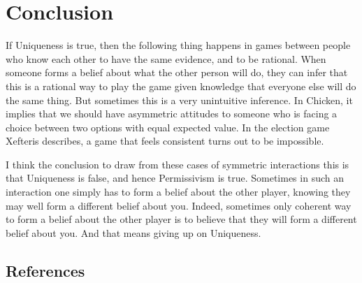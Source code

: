 \documentclass[
  11pt,
  letterpaper,
  DIV=11,
  numbers=noendperiod,
  twoside]{scrartcl}
\begin{document}
\section{Conclusion}\label{conclusion}

If Uniqueness is true, then the following thing happens in games between
people who know each other to have the same evidence, and to be
rational. When someone forms a belief about what the other person will
do, they can infer that this is a rational way to play the game given
knowledge that everyone else will do the same thing. But sometimes this
is a very unintuitive inference. In Chicken, it implies that we should
have asymmetric attitudes to someone who is facing a choice between two
options with equal expected value. In the election game Xefteris
describes, a game that feels consistent turns out to be impossible.

I think the conclusion to draw from these cases of symmetric
interactions this is that Uniqueness is false, and hence Permissivism is
true. Sometimes in such an interaction one simply has to form a belief
about the other player, knowing they may well form a different belief
about you. Indeed, sometimes only coherent way to form a belief about
the other player is to believe that they will form a different belief
about you. And that means giving up on Uniqueness.

\subsection*{References}\label{references}
\end{document}
